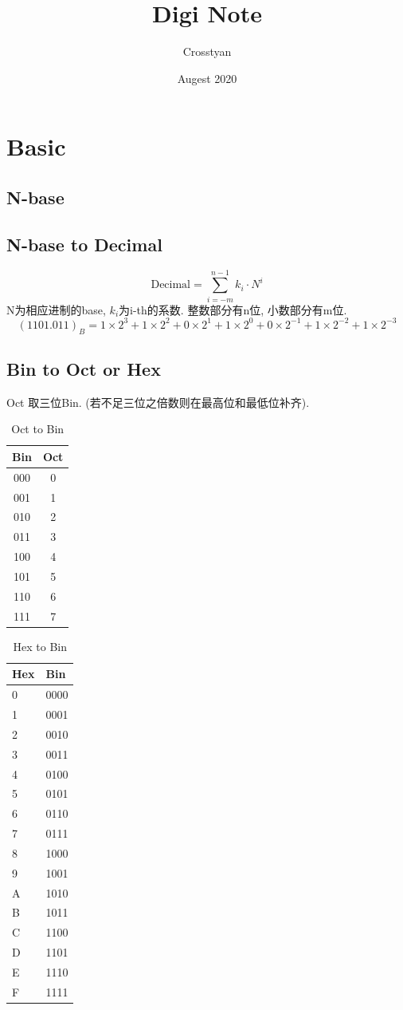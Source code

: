 \documentclass[scheme=chinese,a4paper]{report}
\title{Digi Note}
\author{Crosstyan}
\date{Augest 2020}
\begin{document}
  \chapter{Basic}
  \section{N-base}
  \section{N-base to Decimal}
  $$\text{Decimal}=\sum_{i=-m}^{n-1} k_i\cdot N^i $$
  N为相应进制的base, $ k_i$为i-th的系数. 整数部分有n位, 小数部分有m位. 
  $$ (1101.011)_B=1\times 2^3+ 1\times 2^2+ 0\times 2^1+ 1\times 2^0+ 0\times 2^{-1}+ 1\times 2^{-2}+ 1\times 2^{-3} $$
  \section{Bin to Oct or Hex}
  Oct 取三位Bin. (若不足三位之倍数则在最高位和最低位补齐). 
  \begin{table}
    \centering
    \caption{Oct to Bin}
    \begin{tabular}{c c}
      \hline
      Bin&Oct\\
      \hline
      000&0 \\
      001&1 \\
      010&2 \\
      011&3 \\
      100&4 \\
      101&5 \\
      110&6 \\
      111&7 \\
    \end{tabular}
  \end{table}
  \begin{table}
    \centering
    \caption{Hex to Bin}
      \begin{tabular}{ll}
        \hline
        Hex&Bin\\
        \hline
      0     & 0000 \\
      1     & 0001 \\
      2     & 0010 \\
      3     & 0011 \\
      4     & 0100 \\
      5     & 0101 \\
      6     & 0110 \\
      7     & 0111 \\
      8     & 1000 \\
      9     & 1001 \\
      A     & 1010 \\
      B     & 1011 \\
      C     & 1100 \\
      D     & 1101 \\
      E     & 1110 \\
      F     & 1111 \\
      \end{tabular}%
  \end{table}%
\end{document}
